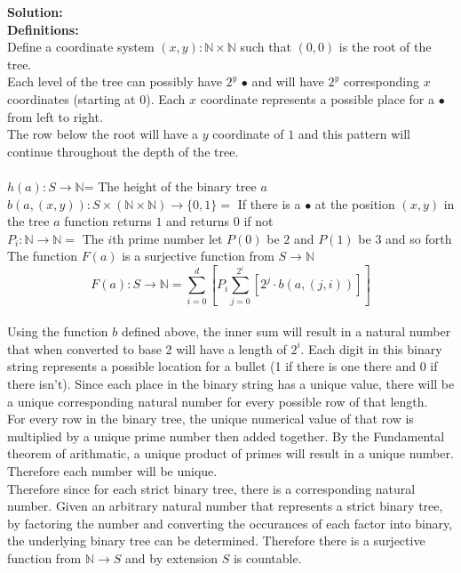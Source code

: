 \documentclass[11pt]{article}
\def\nats {{\mathbb N}}
\begin{document}
\begin{enumerate}
\begin{solution}
{\bf Solution:}\\
{\bf Definitions:}\\
Define a coordinate system $(x,y): \nats\times\nats$ such that $(0,0)$ is the root of the tree.\\
Each level of the tree can possibly have $2^y$ $\bullet$ and will have $2^y$ corresponding $x$ coordinates (starting at 0). Each $x$ coordinate represents a possible place for a $\bullet$ from left to right.\\
The row below the root will have a $y$ coordinate of $1$ and this pattern will continue throughout the depth of the tree.\\\\
$h(a): S\rightarrow \nats$= The height of the binary tree $a$ \\
$b(a, (x, y)): S\times (\nats\times\nats)\rightarrow \{0,1\} =$ If there is a $\bullet$ at the position $(x,y)$ in the tree $a$ function returns $1$ and returns $0$ if not \\
$P_i: \nats\rightarrow\nats = $ The $i$th prime number let $P(0)$ be $2$ and $P(1)$ be $3$ and so forth
The function $F(a)$ is a surjective function from $S\rightarrow \nats$\\
$$F(a): S\rightarrow \nats= \sum_{i=0}^d\left[P_i\sum_{j=0}^{2^i}\left[2^j\cdot b(a,(j,i))\right]\right]$$\\
Using the function $b$ defined above, the inner sum will result in a natural number that when converted to base 2 will have a length of $2^i$. Each digit in this binary string represents a possible location for a bullet (1 if there is one there and 0 if there isn't). Since each place in the binary string has a unique value, there will be a unique corresponding natural number for every possible row of that length.  \\
For every row in the binary tree, the unique numerical value of that row is multiplied by a unique prime number then added together. By the Fundamental theorem of arithmatic, a unique product of primes will result in a unique number. Therefore each number will be unique.\\
Therefore since for each strict binary tree, there is a corresponding natural number. Given an arbitrary natural number that represents a strict binary tree, by factoring the number and converting the occurances of each factor into binary, the underlying binary tree can be determined.
Therefore there is a surjective function from $\nats \rightarrow S$ and by extension $S$ is countable.
\end{solution}
\end{enumerate}
\end{document}
